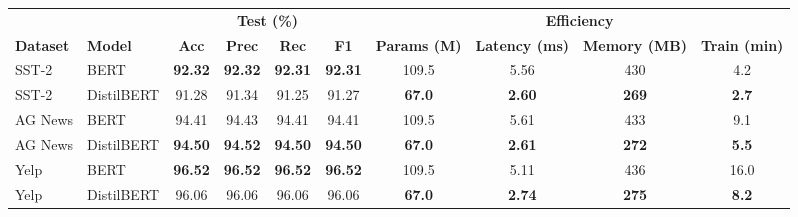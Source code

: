 \begin{tabular}{llcccccccc}
\toprule
\rowcolor{cabecera} &  & \multicolumn{4}{c}{\textbf{Test (\%)}} & \multicolumn{4}{c}{\textbf{Efficiency}} \\
\cmidrule(lr){3-6}\cmidrule(lr){7-10}
\rowcolor{cabecera}\textbf{Dataset} & \textbf{Model} & \textbf{Acc} & \textbf{Prec} & \textbf{Rec} & \textbf{F1} & \textbf{Params (M)} & \textbf{Latency (ms)} & \textbf{Memory (MB)} & \textbf{Train (min)} \\
\midrule
SST-2 & BERT & \textbf{92.32} & \textbf{92.32} & \textbf{92.31} & \textbf{92.31} & 109.5 & 5.56 & 430 & 4.2 \\
SST-2 & DistilBERT & 91.28 & 91.34 & 91.25 & 91.27 & \textbf{67.0} & \textbf{2.60} & \textbf{269} & \textbf{2.7} \\
\midrule
AG News & BERT & 94.41 & 94.43 & 94.41 & 94.41 & 109.5 & 5.61 & 433 & 9.1 \\
AG News & DistilBERT & \textbf{94.50} & \textbf{94.52} & \textbf{94.50} & \textbf{94.50} & \textbf{67.0} & \textbf{2.61} & \textbf{272} & \textbf{5.5} \\
\midrule
Yelp & BERT & \textbf{96.52} & \textbf{96.52} & \textbf{96.52} & \textbf{96.52} & 109.5 & 5.11 & 436 & 16.0 \\
Yelp & DistilBERT & 96.06 & 96.06 & 96.06 & 96.06 & \textbf{67.0} & \textbf{2.74} & \textbf{275} & \textbf{8.2} \\
\bottomrule
\end{tabular}
